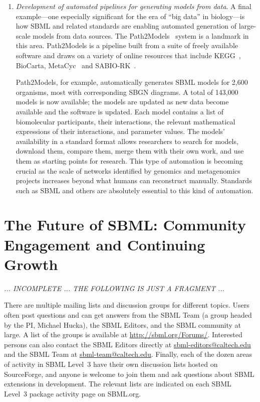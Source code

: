 \begin{enumerate}
\item \emph{Development of automated pipelines for generating models from data}.  A final example---one especially significant for the era of ``big data'' in biology---is how SBML and related standards are enabling automated generation of large-scale models from data sources.  The  Path2Models~\cite{buchel2013path2models} system is a landmark in this area.  Path2Models is a pipeline built from a suite of freely available software and draws on a variety of online resources that include KEGG~\cite{kanehisa2000kegg}, BioCarta, MetaCyc~\cite{caspi2008metacyc} and SABIO-RK~\cite{wittig2012sabio}.  %

Path2Models, for example, automatically generates SBML models for 2,600 organisms, most with corresponding SBGN diagrams.  A total of 143,000 models is now available; the models are updated as new data become available and the software is updated.  
Each model contains a list of biomolecular participants, their interactions, the relevant mathematical expressions of their interactions, and parameter values.  The models' availability in a standard format allows researchers to search for models, download them, compare them, merge them with their own work, and use them as starting points for research.  This type of automation is becoming crucial as the scale of networks identified by genomics and metagenomics projects increases beyond what humans can reconstruct manually.  Standards such as SBML and others are absolutely essential to this kind of automation.

\end{enumerate}



\section{The Future of SBML: Community Engagement and Continuing Growth}

\emph{... INCOMPLETE ... THE FOLLOWING IS JUST A FRAGMENT ...}

There are multiple mailing lists and discussion groups for different topics.  Users often post questions and can get answers from the SBML Team (a group headed by the PI, Michael Hucka), the SBML Editors, and the SBML community at large.  A list of the groups is available at \url{http://sbml.org/Forums/}.  Interested persons can also contact the SBML Editors directly at \url{sbml-editors@caltech.edu} and the SBML Team at \url{sbml-team@caltech.edu}.  Finally, each of the dozen areas of activity in SBML Level~3 have their own discussion lists hosted on SourceForge, and anyone is welcome to join them and ask questions about SBML extensions in development.  The relevant lists are indicated on each SBML Level~3 package activity page on SBML.org.


